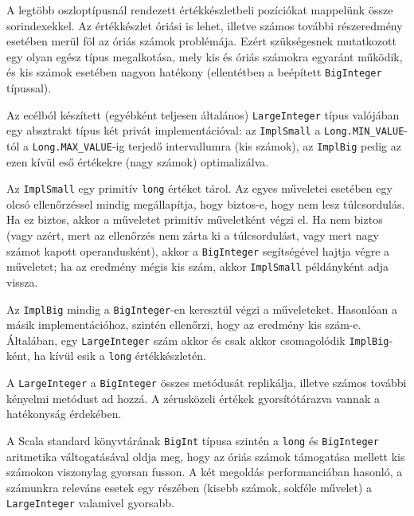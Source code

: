 \documentclass[
    parspace,
    noindent,
    nohyp,
]{elteiktdk}[2023/04/10]
\begin{document}
A legtöbb oszloptípusnál rendezett értékkészletbeli pozíciókat mappelünk össze sorindexekkel.
Az értékkészlet óriási is lehet,
illetve számos további részeredmény esetében merül föl az óriás számok problémája.
Ezért szükségesnek mutatkozott egy olyan egész típus megalkotása,
mely kis és óriás számokra egyaránt működik,
és kis számok esetében nagyon hatékony (ellentétben a beépített \texttt{BigInteger} típussal).

Az ecélból készített (egyébként teljesen általános) \texttt{LargeInteger} típus
valójában egy absztrakt típus két privát implementációval:
az \texttt{ImplSmall} a \texttt{Long.MIN\_VALUE}-tól a \texttt{Long.MAX\_VALUE}-ig
terjedő intervallumra (kis számok),
az \texttt{ImplBig} pedig az ezen kívül eső értékekre (nagy számok) optimalizálva.

Az \texttt{ImplSmall} egy primitív \texttt{long} értéket tárol.
Az egyes műveletei esetében egy olcsó ellenőrzéssel mindig megállapítja,
hogy biztos-e, hogy nem lesz túlcsordulás.
Ha ez biztos, akkor a műveletet primitív műveletként végzi el.
Ha nem biztos
(vagy azért, mert az ellenőrzés nem zárta ki a túlcsordulást,
vagy mert nagy számot kapott operandusként),
akkor a \texttt{BigInteger} segítségével hajtja végre a műveletet;
ha az eredmény mégis kis szám, akkor \texttt{ImplSmall} példányként adja vissza.

Az \texttt{ImplBig} mindig a \texttt{BigInteger}-en keresztül végzi a műveleteket.
Hasonlóan a másik implementációhoz, szintén ellenőrzi, hogy az eredmény kis szám-e.
Általában, egy \texttt{LargeInteger} szám akkor és csak akkor csomagolódik \texttt{ImplBig}-ként,
ha kívül esik a \texttt{long} értékkészletén.

A \texttt{LargeInteger} a \texttt{BigInteger} összes metódusát replikálja,
illetve számos további kényelmi metódust ad hozzá.
A zérusközeli értékek gyorsítótárazva vannak a hatékonyság érdekében.

A Scala standard könyvtárának \texttt{BigInt} típusa szintén a \texttt{long} és \texttt{BigInteger}
aritmetika váltogatásával oldja meg,
hogy az óriás számok támogatása mellett kis számokon viszonylag gyorsan fusson.
A két megoldás performanciában hasonló,
a számunkra releváns esetek egy részében (kisebb számok, sokféle művelet)
a \texttt{LargeInteger} valamivel gyorsabb.
\end{document}
